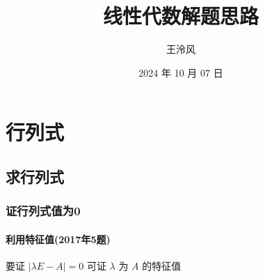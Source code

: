 \documentclass[a4paper,12pt,UTF8]{ctexart}
\begin{document}
    \title{线性代数解题思路}
    \author{王泠风}
    \date{2024 年 10 月 07 日}
    \maketitle
    
    \section{行列式}

    \subsection{求行列式}

    \subsubsection{证行列式值为0}

    \paragraph{利用特征值(2017年5题)}
    要证 \(|\lambda E-A|=0\) 可证 \(\lambda \) 为 \(A\) 的特征值
\end{document}
